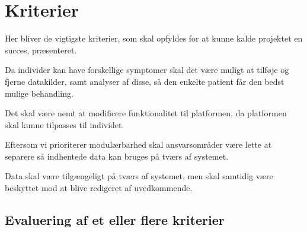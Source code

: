 \section{Kriterier}\label{firstsubseckriterier}
Her bliver de vigtigste kriterier, som skal opfyldes for at kunne kalde projektet en succes, præsenteret.

\begin{description}[style=nextline]
	\item[Modulær] 
	Da individer kan have forskellige symptomer skal det være muligt at tilføje og fjerne datakilder, samt analyser af disse, så den enkelte patient får den bedst mulige behandling.
	\item[Fleksibel]
	Det skal være nemt at modificere funktionalitet til platformen, da platformen skal kunne tilpasses til individet.
	\item[Kombinerbar] Eftersom vi prioriterer modulærbarhed skal ansvarsområder være lette at separere så indhentede data kan bruges på tværs af systemet.
	\item[Kommunikativ] Data skal være tilgængeligt på tværs af systemet, men skal samtidig være beskyttet mod at blive redigeret af uvedkommende.
\end{description}

\subsection{Evaluering af et eller flere kriterier}
